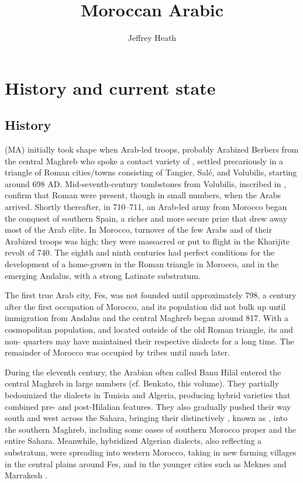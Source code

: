 \documentclass[output=paper]{langsci/langscibook}
\title{Moroccan Arabic}
\author{Jeffrey Heath\affiliation{University of Michigan}}
\begin{document}
\section{History and current state}

\subsection{History}

  (MA) initially took shape when Arab-led troops, probably Arabized Berbers from the central Maghreb who spoke a contact variety of , settled precariously in a triangle of Roman cities/towns consisting of Tangier, Salé, and Volubilis, starting around 698 AD. Mid-seventh-century tombstones from Volubilis, inscribed in , confirm that Roman  were present, though in small numbers, when the Arabs arrived. Shortly thereafter, in 710–711, an Arab-led army from Morocco began the conquest of southern Spain, a richer and more secure prize that drew away most of the Arab elite. In Morocco, turnover of the few Arabs and of their Arabized  troops was high; they were massacred or put to flight in the Kharijite revolt of 740. The eighth and ninth centuries had perfect conditions for the development of a home-grown  in the Roman triangle in Morocco, and in the emerging Andalus, with a strong Latinate substratum.  

The first true Arab city, Fes, was not founded until approximately 798, a century after the first occupation of Morocco, and its population did not bulk up until immigration from Andalus and the central Maghreb began around 817. With a cosmopolitan population, and located outside of the old Roman triangle, its  and non- quarters may have maintained their respective dialects for a long time. The remainder of Morocco was occupied by  tribes until much later.

During the eleventh century, the Arabian  often called Banu Hilāl entered the central Maghreb in large numbers (cf. Benkato, this volume). They partially bedouinized the  dialects in Tunisia and Algeria, producing hybrid varieties that combined pre- and post-Hilalian features. They also gradually pushed their way south and west across the Sahara, bringing their distinctively  , known as , into the southern Maghreb, including some oases of southern Morocco proper and the entire  Sahara. Meanwhile, hybridized Algerian dialects, also reflecting a  substratum, were spreading into western Morocco, taking  in new farming villages in the central plains around Fes, and in the younger cities such as Meknes and Marrakesh \citep{Heath2002}.
\end{document}
